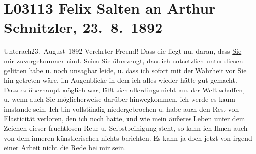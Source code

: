

\section[Felix Salten an Arthur Schnitzler, 23. 8. 1892]{L03113 Felix Salten an Arthur Schnitzler, 23. 8. 1892}
\nopagebreak{}
\rehead{ }\normalsize\beginnumbering{}
\toendnotes[C]{\smallbreak\pagebreak[2]}
\toendnotes[C]{\smallbreak}
\toendnotes[C]{\smallbreak}
\pstart
           \raggedleft{}{\pb}Unterach23. August 1892\pend
           \vspace{0.5em}
\pstart
           Verehrter Freund! Dass die \label{K_L03113-1v}\label{K_L03113-1} liegt nur daran, dass \uline{Sie} mir zuvorgekommen
               sind. Seien Sie überzeugt, dass ich entsetzlich unter diesen \label{K_L03113-2v}\label{K_L03113-2} gelitten habe u. noch unsagbar leide, u. dass ich sofort mit der Wahrheit vor
               Sie hin getreten wäre, im Augenblicke in dem ich alles wieder hätte gut gemacht. Dass
               es überhaupt möglich war, läßt sich allerdings nicht aus der Welt schaffen, u. wenn
               auch Sie möglicher{\pb}weise darüber hinwegkommen, ich werde
               es kaum imstande sein. Ich bin vollständig niedergebrochen u. habe auch
               den Rest von Elasticität verloren, den ich noch hatte, und wie mein äußeres
               Leben unter dem Zeichen dieser fruchtlosen
               Reue u. Selbstpeinigung steht, so kann ich Ihnen auch von dem inneren
               künstlerischen nichts berichten. Es kann ja doch jetzt von irgend einer 
               Arbeit nicht die Rede bei mir sein.\pend
           
